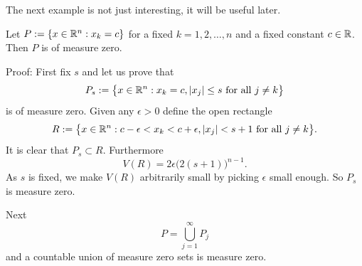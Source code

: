 The next example is not just interesting, it will be useful later.

\begin{example} \label{mv:example:planenull}
Let $P := \{ x \in {\mathbb{R}}^n : x_k = c \}$ for a fixed $k=1,2,\ldots,n$ and
a fixed constant $c \in {\mathbb{R}}$.  Then $P$ is of measure zero.

Proof:
First fix $s$ and let us prove that
\begin{equation*}
P_s := \bigl\{ x \in {\mathbb{R}}^n : x_k = c, \lvert {x_j} \rvert \leq s
\text{ for all } j\not=k \bigr\}
\end{equation*}
is of measure zero.
Given any $\epsilon > 0$ define the open rectangle
\begin{equation*}
R := \bigl\{ x \in {\mathbb{R}}^n : c-\epsilon < x_k < c+\epsilon, \lvert {x_j} \rvert < s+1
\text{ for all } j\not=k \bigr\} .
\end{equation*}
It is clear that $P_s \subset R$.  Furthermore
\begin{equation*}
V(R) = 2\epsilon {\bigl(2(s+1)\bigr)}^{n-1} .
\end{equation*}
As $s$ is fixed, we
make $V(R)$
arbitrarily small by
picking $\epsilon$ small enough.
So $P_s$ is measure zero.

Next 
\begin{equation*}
P = \bigcup_{j=1}^\infty P_j
\end{equation*}
and a countable union of measure zero sets is measure zero.
\end{example}

